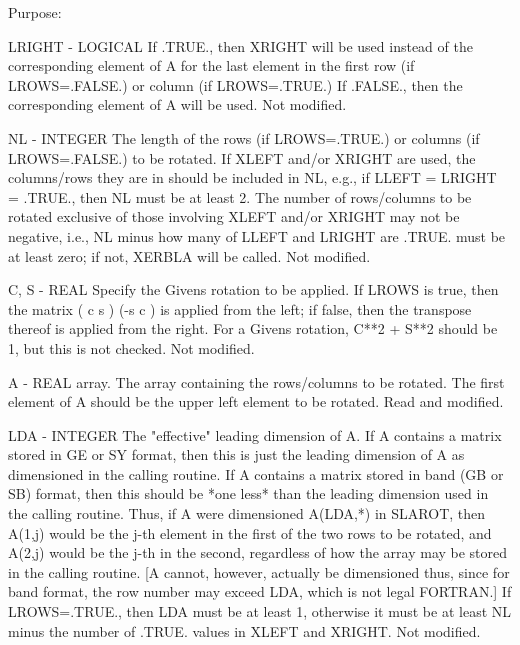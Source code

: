 \begin{DoxyParagraph}{Purpose\+: }
\begin{DoxyVerb}
  LRIGHT - LOGICAL
           If .TRUE., then XRIGHT will be used instead of the
           corresponding element of A for the last element in the
           first row (if LROWS=.FALSE.) or column (if LROWS=.TRUE.) If
           .FALSE., then the corresponding element of A will be used.
           Not modified.

  NL     - INTEGER
           The length of the rows (if LROWS=.TRUE.) or columns (if
           LROWS=.FALSE.) to be rotated.  If XLEFT and/or XRIGHT are
           used, the columns/rows they are in should be included in
           NL, e.g., if LLEFT = LRIGHT = .TRUE., then NL must be at
           least 2.  The number of rows/columns to be rotated
           exclusive of those involving XLEFT and/or XRIGHT may
           not be negative, i.e., NL minus how many of LLEFT and
           LRIGHT are .TRUE. must be at least zero; if not, XERBLA
           will be called.
           Not modified.

  C, S   - REAL
           Specify the Givens rotation to be applied.  If LROWS is
           true, then the matrix ( c  s )
                                 (-s  c )  is applied from the left;
           if false, then the transpose thereof is applied from the
           right.  For a Givens rotation, C**2 + S**2 should be 1,
           but this is not checked.
           Not modified.

  A      - REAL array.
           The array containing the rows/columns to be rotated.  The
           first element of A should be the upper left element to
           be rotated.
           Read and modified.

  LDA    - INTEGER
           The "effective" leading dimension of A.  If A contains
           a matrix stored in GE or SY format, then this is just
           the leading dimension of A as dimensioned in the calling
           routine.  If A contains a matrix stored in band (GB or SB)
           format, then this should be *one less* than the leading
           dimension used in the calling routine.  Thus, if
           A were dimensioned A(LDA,*) in SLAROT, then A(1,j) would
           be the j-th element in the first of the two rows
           to be rotated, and A(2,j) would be the j-th in the second,
           regardless of how the array may be stored in the calling
           routine.  [A cannot, however, actually be dimensioned thus,
           since for band format, the row number may exceed LDA, which
           is not legal FORTRAN.]
           If LROWS=.TRUE., then LDA must be at least 1, otherwise
           it must be at least NL minus the number of .TRUE. values
           in XLEFT and XRIGHT.
           Not modified.


\end{DoxyVerb}
\end{DoxyParagraph}
